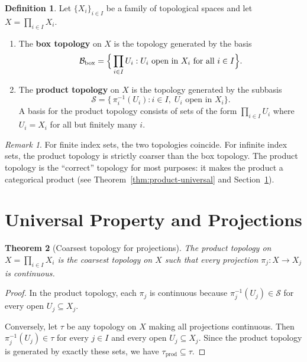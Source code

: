 \documentclass[11pt,a4paper,twoside]{book}
\newtheorem{theorem}{Theorem}[section]
\theoremstyle{remark}
\newtheorem{remark}[theorem]{Remark}
\theoremstyle{definition}
\theoremstyle{definition}
\newtheorem{definition}{Definition}[section]
\begin{document}
\begin{definition}\label{def:product-box-topology}
Let $\{X_i\}_{i\in I}$ be a family of topological spaces and let
$X=\prod_{i\in I}X_i$.
\begin{enumerate}
\item The \textbf{box topology} on $X$ is the
      topology generated by the basis
      \[
         \mathcal{B}_{\mathrm{box}} = \Bigl\{\,\prod_{i\in I}U_i :
            U_i\text{ open in }X_i\text{ for all }i\in I\Bigr\}.
      \]
\item The \textbf{product topology} on $X$ is the topology generated
      by the subbasis
      \[
         \mathcal{S} = \bigl\{\,\pi_i^{-1}(U_i) : i\in I,\;
            U_i\text{ open in }X_i\bigr\}.
      \]
      A basis for the product topology consists of sets of the form
      $\prod_{i\in I}U_i$ where $U_i=X_i$ for all but finitely
      many $i$.
\end{enumerate}
\end{definition}

\begin{remark}\label{rem:box-vs-product}
For finite index sets, the two topologies coincide.  For infinite
index sets, the product topology is strictly coarser than the box
topology.  The product topology is the ``correct'' topology for
most purposes: it makes the product a categorical product (see
Theorem~\ref{thm:product-universal} and
Section~\ref{sec:universal-product}).
\end{remark}

\section{Universal Property and Projections}
\label{sec:universal-product}

\begin{theorem}[Coarsest topology for projections]
\label{thm:product-coarsest}
The product topology on $X=\prod_{i\in I}X_i$ is the coarsest
topology on $X$ such that every projection
$\pi_j\colon X\to X_j$ is continuous.
\end{theorem}

\begin{proof}
In the product topology, each $\pi_j$ is continuous because
$\pi_j^{-1}(U_j)\in\mathcal{S}$ for every open $U_j\subseteq X_j$.

Conversely, let $\tau$ be any topology on $X$ making all projections
continuous.  Then $\pi_j^{-1}(U_j)\in\tau$ for every $j\in I$ and
every open $U_j\subseteq X_j$.  Since the product topology is
generated by exactly these sets, we have $\tau_{\mathrm{prod}}\subseteq\tau$.
\end{proof}
\end{document}
